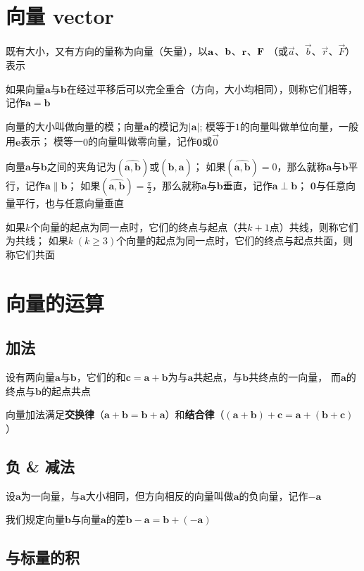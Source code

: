 \documentclass[UTF8]{ctexart}
\newcommand{\ve}[1]{{\bm{#1}}}
\newcommand{\ang}[2]{{(\widehat{\ve{#1},\ve{#2}})}}
\begin{document}
\section*{向量 vector}

既有大小，又有方向的量称为向量（矢量），以$\bf{a}$、$\bf{b}$、$\bf{r}$、$\bf{F}$
（或$\vec{a}$、$\vec{b}$、$\vec{r}$、$\vec{F}$）表示

如果向量$\ve{a}$与$\ve{b}$在经过平移后可以完全重合（方向，大小均相同），则称它们相等，
记作$\ve{a}=\ve{b}$

向量的大小叫做向量的模；向量$\ve{a}$的模记为$|\ve{a}|$;
模等于$1$的向量叫做单位向量，一般用$\ve{e}$表示；
模等一$0$的向量叫做零向量，记作$\ve{0}$或$\vec{0}$

向量$\ve{a}$与$\ve{b}$之间的夹角记为$(\widehat{\ve{a},\ve{b}})$或$(\widehat{\ve{b},\ve{a}})$；
如果$\ang{a}{b}=0$，那么就称$\ve{a}$与$\ve{b}$平行，记作$\ve{a}\parallel\ve{b}$；
如果$\ang{a}{b}=\frac{\pi}{2}$，那么就称$\ve{a}$与$\ve{b}$垂直，记作$\ve{a}\perp\ve{b}$；
$\ve{0}$与任意向量平行，也与任意向量垂直

如果$k$个向量的起点为同一点时，它们的终点与起点（共$k+1$点）共线，则称它们为共线；
如果$k\;(k\ge3)$个向量的起点为同一点时，它们的终点与起点共面，则称它们共面
\bigskip
\bigskip

\section*{向量的运算}
\subsection*{加法}

设有两向量$\ve{a}$与$\ve{b}$，它们的和$\ve{c}=\ve{a}+\ve{b}$为与$\ve{a}$共起点，与$\ve{b}$共终点的一向量，
而$\ve{a}$的终点与$\ve{b}$的起点共点

向量加法满足{\bf 交换律}（$\ve{a}+\ve{b}=\ve{b}+\ve{a}$）和{\bf 结合律}（$(\ve{a}+\ve{b})+\ve{c}=\ve{a}+(\ve{b}+\ve{c})$）

\subsection*{负 \& 减法}


设$\ve{a}$为一向量，与$\ve{a}$大小相同，但方向相反的向量叫做$\ve{a}$的负向量，记作$-\ve{a}$

我们规定向量$\ve{b}$与向量$\ve{a}$的差$\ve{b}-\ve{a}=\ve{b}+(-\ve{a})$

\subsection*{与标量的积}
\end{document}
